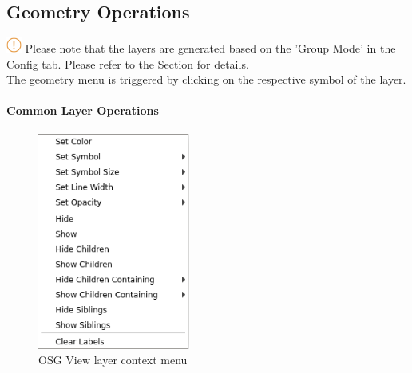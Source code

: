 \subsection{Geometry Operations}
\label{sec:geometry_operations}

\includegraphics[width=0.5cm]{../../data/icons/hint.png} Please note that the layers are generated based on the 'Group Mode' in the Config tab. Please refer to the Section  for details. \\

The geometry menu is triggered by clicking on the respective symbol of the layer.\\

\paragraph{Common Layer Operations}
\begin{figure}[H]
    \includegraphics[width=5cm,frame]{../screenshots/osgview_layer_context_menu.png}
  \caption{OSG View layer context menu}
\end{figure}

